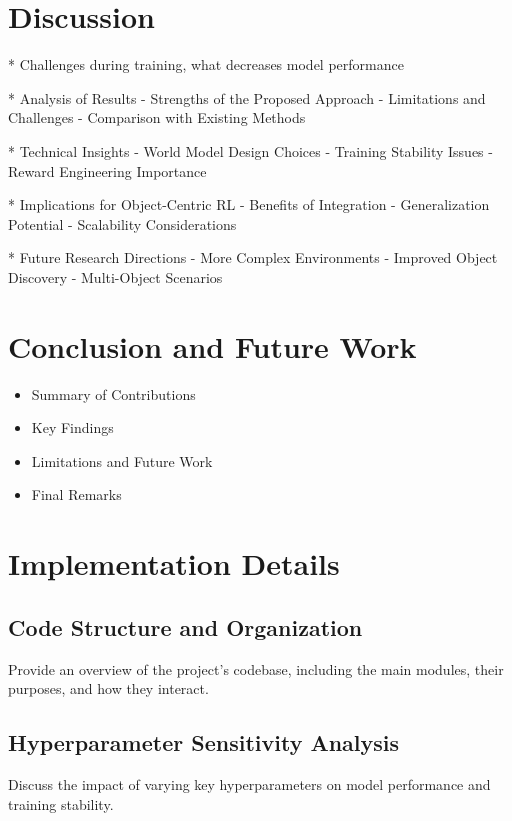 \documentclass[
	english,
	ruledheaders=section,
	class=report,
	thesis={type=master},
	accentcolor=9c,
	custommargins=true,
	marginpar=false,
	parskip=half-,
	fontsize=11pt,
]{tudapub}
\begin{document}
\chapter{Discussion}
\label{chap:discussion}
* Challenges during training, what decreases model performance

* Analysis of Results
- Strengths of the Proposed Approach
- Limitations and Challenges
- Comparison with Existing Methods

* Technical Insights
- World Model Design Choices
- Training Stability Issues
- Reward Engineering Importance

* Implications for Object-Centric RL
- Benefits of Integration
- Generalization Potential
- Scalability Considerations

* Future Research Directions
- More Complex Environments
- Improved Object Discovery
- Multi-Object Scenarios

\chapter{Conclusion and Future Work}
\label{chap:conclusion}

\begin{itemize}
	\item Summary of Contributions
	\item Key Findings
	\item Limitations and Future Work
	\item Final Remarks
\end{itemize}

\printbibliography[title={References}]

\appendix

\chapter{Implementation Details}
\label{app:implementation}

\section{Code Structure and Organization}
\label{app:code_structure}
Provide an overview of the project's codebase, including the main modules, their purposes, and how they interact.

\section{Hyperparameter Sensitivity Analysis}
\label{app:hyperparameter_analysis}
Discuss the impact of varying key hyperparameters on model performance and training stability.
\end{document}
